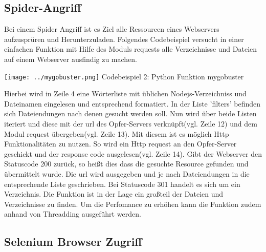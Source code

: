 \documentclass[12pt]{article}
\begin{document}
\subsection{Spider-Angriff}
Bei einem Spider Angriff ist es Ziel alle Ressourcen eines Webservers aufzusprüren und Herunterzuladen.
Folgendes Codebeispiel versucht in einer einfachen Funktion mit Hilfe des Moduls requests alle Verzeichnisse und Dateien auf einem Webserver ausfindig zu machen.
\begin{center}
\texttt{[image: ../mygobuster.png]}
Codebeispiel 2: Python Funktion mygobuster
\end{center}
Hierbei wird in Zeile 4 eine Wörterliste mit üblichen Nodejs-Verzeichniss und Dateinamen eingelesen und entsprechend formatiert.
In der Liste 'filters' befinden sich Dateiendungen nach denen gesucht werden soll. Nun wird über beide Listen iteriert und diese mit der url des Opfer-Servers verknüpft(vgl. Zeile 12) und dem Modul request übergeben(vgl. Zeile 13). Mit diesem ist es möglich Http Funktionalitäten zu nutzen. So wird ein Http request an den Opfer-Server geschickt und der response code ausgelesen(vgl. Zeile 14). Gibt der Webserver den Statuscode 200 zurück, so heißt dies dass die gesuchte Resource gefunden und übermittelt wurde. Die url wird ausgegeben und je nach Dateiendungen in die entsprechende Liste geschrieben. Bei Statuscode 301 handelt es sich um ein Verzeichnis.
Die Funktion ist in der Lage ein großteil der Dateien und Verzeichnisse zu finden. Um die Perfomance zu erhöhen kann die Funktion zudem anhand von Threadding ausgeführt werden.



\subsection{Selenium Browser Zugriff}
\end{document}
